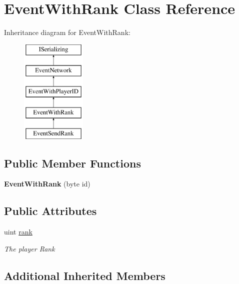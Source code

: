 \hypertarget{class_event_with_rank}{\section{Event\-With\-Rank Class Reference}
\label{class_event_with_rank}
}
Inheritance diagram for Event\-With\-Rank\-:\begin{figure}[H]
\begin{center}
\leavevmode
\includegraphics[height=5.000000cm]{class_event_with_rank}
\end{center}
\end{figure}
\subsection*{Public Member Functions}
\begin{DoxyCompactItemize}
\item 
\hypertarget{class_event_with_rank_a4d0549af46640d8030477954c4c78f55}{{\bfseries Event\-With\-Rank} (byte id)}\label{class_event_with_rank_a4d0549af46640d8030477954c4c78f55}

\end{DoxyCompactItemize}
\subsection*{Public Attributes}
\begin{DoxyCompactItemize}
\item 
uint \hyperlink{class_event_with_rank_ab7a5557f1fe949d90945003b566d33db}{rank}
\begin{DoxyCompactList}\small\item\em The player Rank \end{DoxyCompactList}\end{DoxyCompactItemize}
\subsection*{Additional Inherited Members}


